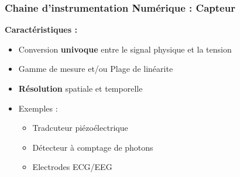 \documentclass{beamer}
\begin{document}
\begin{frame}
\frametitle{Chaine d'instrumentation Numérique : Capteur}
\begin{center}
\end{center}
\vspace{0.1cm}
\textbf{Caractéristiques :}\\
\vspace{0.1cm}
\begin{itemize}
\item Conversion \textbf{univoque} entre le signal physique et la tension
\vspace{0.1cm}
\item Gamme de mesure et/ou Plage de linéarite
\vspace{0.1cm}
\item \textbf{Résolution} spatiale et temporelle
\vspace{0.1cm}
\item Exemples : 
\begin{itemize}
\item Tradcuteur piézoélectrique
\vspace{0.1cm}
\item Détecteur à comptage de photons
\vspace{0.1cm}
\item Electrodes ECG/EEG
\end{itemize}
\vspace{0.1cm}
\end{itemize}
\end{frame}
\end{document}
